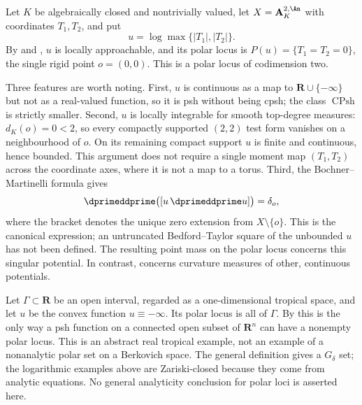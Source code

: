 \begin{example}
\label{ex:ch15-polar-example}
Let $K$ be algebraically closed and nontrivially valued, let
$X=\mathbf A^{2,\An}_K$ with coordinates $T_1,T_2$, and put
\[
 u=\log\max\{|T_1|,|T_2|\}.
\]
By  and , $u$
is locally approachable, and its polar locus is
$P(u)=\{T_1=T_2=0\}$, the single rigid point $o=(0,0)$.  This is a polar
locus of codimension two.

Three features are worth noting.  First, $u$ is continuous as a map to
$\mathbf R\cup\{-\infty\}$ but not as a real-valued function, so it is psh
without being cpsh; the class $\operatorname{CPsh}$ is strictly smaller.
Second, $u$ is locally integrable for smooth top-degree measures:
$d_K(o)=0<2$, so every compactly supported $(2,2)$ test form vanishes on
a neighbourhood of $o$.  On its remaining compact support $u$ is finite
and continuous, hence bounded.  This argument does not require a single
moment map $(T_1,T_2)$ across the coordinate axes, where it is not a map
to a torus.  Third, the Bochner--Martinelli formula gives
\[
 \dprimeddprime\bigl([u\,\dprimeddprime u]\bigr)=\delta_o,
\]
where the bracket denotes the unique zero extension from $X\setminus\{o\}$.
This is the canonical expression; an untruncated Bedford--Taylor square
of the unbounded $u$ has not been defined.  The resulting point mass on
the polar locus concerns this singular potential.  In contrast,
 concerns curvature measures of other,
continuous potentials.
\end{example}

\begin{example}
\label{ex:ch15-polar-nonanalytic}
Let $\Gamma\subset\mathbf R$ be an open interval, regarded as a
one-dimensional tropical space, and let $u$ be the convex function
$u\equiv-\infty$.  Its polar locus is all of $\Gamma$.  By
 this is the only way a psh function on a
connected open subset of $\mathbf R^n$ can have a nonempty polar locus.  This is an abstract real tropical example, not an example of a
nonanalytic polar set on a Berkovich space.  The general definition gives
a $G_\delta$ set; the logarithmic examples above are Zariski-closed
because they come from analytic equations.  No general analyticity
conclusion for polar loci is asserted here.
\end{example}

